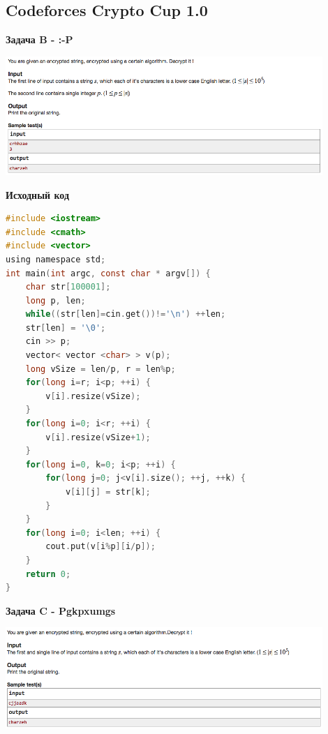 \documentclass[a4paper,12pt]{article}
\begin{document}
%
%
\newpage
\subsection{Codeforces Crypto Cup 1.0}

\textbf{{\large Задача B - :-P}} \\
\begin{center}
\includegraphics[width=0.9\textwidth]{CT_Crypto/CT_Crypto_B.png}\\ [1cm]
\end{center}

\textbf{{\large Исходный код}}
\begin{lstlisting}[language=C]
#include <iostream>
#include <cmath>
#include <vector>
using namespace std;
int main(int argc, const char * argv[]) {
    char str[100001];
    long p, len;
    while((str[len]=cin.get())!='\n') ++len;
    str[len] = '\0';
    cin >> p;
    vector< vector <char> > v(p);
    long vSize = len/p, r = len%p;
    for(long i=r; i<p; ++i) {
        v[i].resize(vSize);
    }
    for(long i=0; i<r; ++i) {
        v[i].resize(vSize+1);
    }
    for(long i=0, k=0; i<p; ++i) {
        for(long j=0; j<v[i].size(); ++j, ++k) {
            v[i][j] = str[k];
        }
    }
    for(long i=0; i<len; ++i) {
        cout.put(v[i%p][i/p]);
    }
    return 0;
}
\end{lstlisting}

\newpage
\textbf{{\large Задача C - Pgkpxumgs}} \\
\begin{center}
\includegraphics[width=0.9\textwidth]{CT_Crypto/CT_Crypto_C.png}\\ [1cm]
\end{center}
\end{document}
